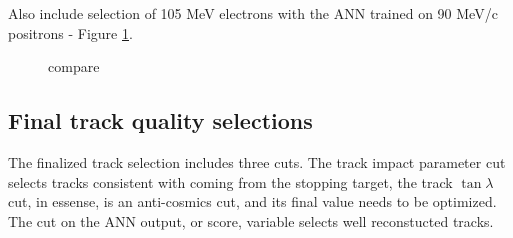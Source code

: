 Also include selection of 105 MeV electrons with the ANN trained on 90 MeV/c positrons - 
Figure \ref{fig:mumep_trq_ann_1070_vs_0170}.


\begin{figure}
  \caption{
    \label{fig:mumep_trq_ann_1070_vs_0170} 
    compare
  }
\end{figure}


\subsection{Final track quality selections}

The finalized track selection includes three cuts. The track impact parameter cut selects tracks consistent 
with coming from the stopping target, the track $\tan\lambda$ cut, in essense, is an anti-cosmics cut, and 
its final value needs to be optimized. The cut on the ANN output, or score, variable selects
well reconstucted tracks.


